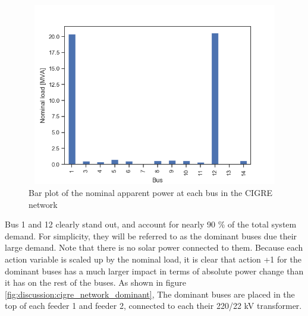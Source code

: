 \documentclass[class=book, crop=false]{standalone}
\begin{document}
\begin{figure}[h]
    \center
\includegraphics[height=8cm, width=12cm]{figures/nominal_load.png}
    \caption[size = 9]{Bar plot of the nominal apparent power at each bus in the CIGRE network}
    \label{fig:discussion:nominal_load}
\end{figure}

Bus 1 and 12 clearly stand out, and account for nearly 90 \% of the total system demand. For simplicity, they will be referred to as the dominant buses due their large demand. Note that there is no solar power connected to them. Because each action variable is scaled up by the nominal load, it is clear that action +1 for the dominant buses has a much larger impact in terms of absolute power change than it has on the rest of the buses. As shown in figure \ref{fig:discussion:cigre_network_dominant}, The dominant buses are placed in the top of each feeder 1 and feeder 2, connected to each their 220/22 kV transformer. 
\end{document}
